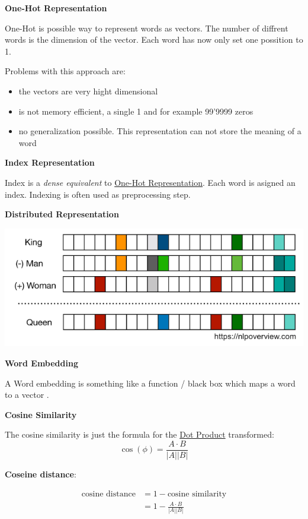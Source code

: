 \documentclass[11pt,twoside,landscape]{article}
\begin{document}
\begin{multicols}{3}
\textbf{One-Hot Representation}

One-Hot is possible way to represent words as vectors.
The number of diffrent words is the dimension of the vector.
Each word has now only set one possition to 1.

Problems with this approach are:
\begin{itemize}
\item the vectors are very hight dimensional
\item is not memory efficient, a single 1 and for example 99'9999 zeros
\item no generalization possible. This representation can not store the meaning of a word
\end{itemize}


\textbf{Index Representation}

Index is a \emph{dense equivalent} to \href{../../../roam/20211004181318-one_hot_representation.org}{One-Hot Representation}.
Each word is asigned an index.
Indexing is often used as preprocessing step.


\textbf{Distributed Representation}

\begin{center}
\includegraphics[width=.9\linewidth]{img/distributed_representation.png}
\end{center}


\textbf{Word Embedding}

A Word embedding is something like a function / black box which maps a word to a vector .


\textbf{Cosine Similarity}

The cosine similarity is just the formula for the \href{../../../roam/20211004182731-dot_product.org}{Dot Product} transformed:
$$
\cos(\phi) = \frac{A \cdot B}{|A||B|}
$$

\textbf{Coseine distance}:

\begin{align}
\text{cosine distance} &= 1 - \text{cosine similarity} \\
&= 1 - \frac{A \cdot B}{|A||B|}
\end{align}


\end{multicols}
\end{document}
